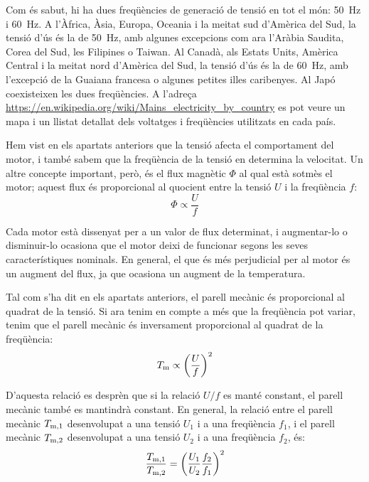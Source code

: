 Com és sabut, hi ha dues freqüències de generació de tensió en tot el món: \qty{50}{Hz} i \qty{60}{Hz}. A l'Àfrica, Àsia, Europa,  Oceania i la meitat sud d'Amèrica del Sud, la tensió d'ús és la de \qty{50}{Hz}, amb algunes excepcions com ara l'Aràbia Saudita, Corea del Sud, les Filipines o Taiwan. Al Canadà, als Estats Units, Amèrica Central i la meitat nord  d'Amèrica del Sud, la tensió d'ús és la de \qty{60}{Hz}, amb l'excepció de la Guaiana francesa o algunes petites illes caribenyes. Al Japó coexisteixen les dues freqüències. A l'adreça \href{https://en.wikipedia.org/wiki/Mains_electricity_by_country}
{https://en.wikipedia.org/wiki/Mains\_electricity\_by\_country} es pot veure un mapa i un llistat detallat dels voltatges i freqüències utilitzats en cada país.

Hem vist en els apartats anteriors que la tensió afecta el comportament del motor, i també sabem que la freqüència de la tensió en determina la velocitat. Un altre concepte important, però, és el flux magnètic $\Phi$ al qual està sotmès el motor; aquest flux és proporcional al quocient entre la tensió $U$ i la freqüència $f$:
\begin{equation}
	\Phi \propto \frac{U}{f}
\end{equation}

Cada motor està dissenyat per a un valor de flux determinat, i augmentar-lo  o disminuir-lo ocasiona que el motor deixi de funcionar segons les seves característiques nominals. En general, el que és més perjudicial per al motor és un augment del flux, ja que  ocasiona un  augment de la temperatura.

Tal com s'ha dit en els apartats anteriors, el parell mecànic és proporcional al quadrat de la tensió. Si ara tenim en compte a més que la freqüència pot variar, tenim que el parell mecànic és inversament proporcional al quadrat de la freqüència:
\begin{equation}
	T_\mathrm{m} \propto {\left(\frac{U}{f}\right)}^2
\end{equation}

D'aquesta relació es desprèn que si la relació $U/f$ es manté constant, el parell mecànic també es mantindrà constant. En general, la relació entre el parell mecànic $T_\mathrm{m,1}$ desenvolupat a una tensió $U_1$ i a una freqüència $f_1$, i el parell mecànic $T_\mathrm{m,2}$ desenvolupat a una tensió $U_2$ i a una freqüència $f_2$, és:
\begin{equation}\label{eq:Tm_U_f}
	\frac{T_\mathrm{m,1}}{T_\mathrm{m,2}}={\left(\frac{{U}_{1}}{{U}_{2}}\frac{{f}_{2}}{{f}_{1}}\right)}^2
\end{equation}

